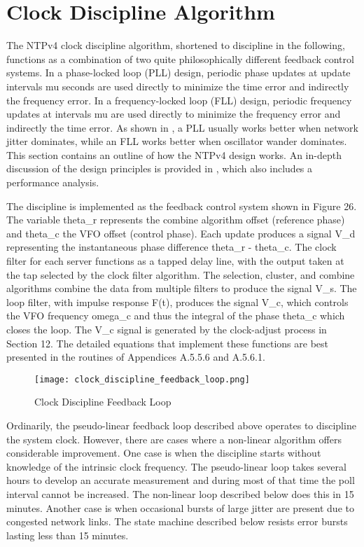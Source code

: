 \section{Clock Discipline Algorithm}

The NTPv4 clock discipline algorithm, shortened to discipline in the
following, functions as a combination of two quite philosophically
different feedback control systems.  In a phase-locked loop (PLL)
design, periodic phase updates at update intervals mu seconds are
used directly to minimize the time error and indirectly the frequency
error.  In a frequency-locked loop (FLL) design, periodic frequency
updates at intervals mu are used directly to minimize the frequency
error and indirectly the time error.  As shown in \cite{ref7}, a PLL
usually works better when network jitter dominates, while an FLL
works better when oscillator wander dominates.  This section contains
an outline of how the NTPv4 design works.  An in-depth discussion of
the design principles is provided in \cite{ref7}, which also includes a
performance analysis.

The discipline is implemented as the feedback control system shown in
Figure 26.  The variable theta\_r represents the combine algorithm
offset (reference phase) and theta\_c the VFO offset (control phase).
Each update produces a signal V\_d representing the instantaneous
phase difference theta\_r - theta\_c.  The clock filter for each server
functions as a tapped delay line, with the output taken at the tap
selected by the clock filter algorithm.  The selection, cluster, and
combine algorithms combine the data from multiple filters to produce
the signal V\_s.  The loop filter, with impulse response F(t),
produces the signal V\_c, which controls the VFO frequency omega\_c and
thus the integral of the phase theta\_c which closes the loop.  The
V\_c signal is generated by the clock-adjust process in Section 12.
The detailed equations that implement these functions are best
presented in the routines of Appendices A.5.5.6 and A.5.6.1.

\begin{figure}
\centering
\texttt{[image: clock\_discipline\_feedback\_loop.png]}
\caption{Clock Discipline Feedback Loop}
\label{clock_discipline_feedback_loop}
\end{figure}

Ordinarily, the pseudo-linear feedback loop described above operates
to discipline the system clock.  However, there are cases where a
non-linear algorithm offers considerable improvement.  One case is
when the discipline starts without knowledge of the intrinsic clock
frequency.  The pseudo-linear loop takes several hours to develop an
accurate measurement and during most of that time the poll interval
cannot be increased.  The non-linear loop described below does this
in 15 minutes.  Another case is when occasional bursts of large
jitter are present due to congested network links.  The state machine
described below resists error bursts lasting less than 15 minutes.


